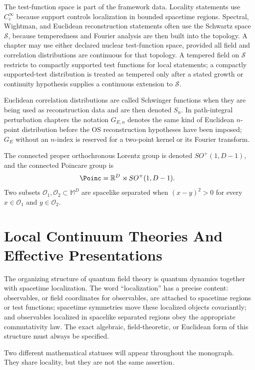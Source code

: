 The test-function space is part of the framework data.  Locality statements
use \(C_c^\infty\) because support controls localization in bounded spacetime
regions.  Spectral, Wightman, and Euclidean reconstruction statements often
use the Schwartz space \(\mathcal S\), because temperedness and Fourier
analysis are then built into the topology.  A chapter may use either declared
nuclear test-function space, provided all field and correlation distributions
are continuous for that topology.  A tempered field on \(\mathcal S\) restricts
to compactly supported test functions for local statements; a compactly
supported-test distribution is treated as tempered only after a stated growth
or continuity hypothesis supplies a continuous extension to \(\mathcal S\).

Euclidean correlation distributions are called Schwinger functions when they
are being used as reconstruction data and are then denoted \(S_n\).  In
path-integral perturbation chapters the notation \(G_{E,n}\) denotes the same
kind of Euclidean \(n\)-point distribution before the OS reconstruction
hypotheses have been imposed; \(G_E\) without an \(n\)-index is reserved for a
two-point kernel or its Fourier transform.

The connected proper orthochronous Lorentz group is denoted
\(SO^+(1,D-1)\), and the connected Poincare group is
\[
  \Poinc=\mathbb R^D\rtimes SO^+(1,D-1).
\]
Two subsets
\(\mathcal O_1,\mathcal O_2\subset\mathbb M^D\) are spacelike separated when
\((x-y)^2>0\) for every \(x\in\mathcal O_1\) and
\(y\in\mathcal O_2\).

\section{Local Continuum Theories And Effective Presentations}

The organizing structure of quantum field theory is quantum dynamics together
with spacetime localization.  The word ``localization'' has a precise content:
observables, or field coordinates for observables, are attached to spacetime
regions or test functions; spacetime symmetries move these localized objects
covariantly; and observables localized in spacelike separated regions obey the
appropriate commutativity law.  The exact algebraic, field-theoretic, or
Euclidean form of this structure must always be specified.

Two different mathematical statuses will appear throughout the monograph.
They share locality, but they are not the same assertion.


